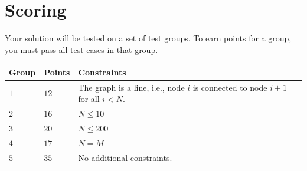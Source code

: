 \section*{Scoring}
Your solution will be tested on a set of test groups.
To earn points for a group, you must pass all test cases in that group.

\noindent
\begin{tabular}{| l | l | l |}
\hline
\textbf{Group} & \textbf{Points} & \textbf{Constraints} \\ \hline
$1$   & $12$       & The graph is a line, i.e., node $i$ is connected to node $i+1$ for all $i < N$. \\ \hline
$2$   & $16$       & $N \leq 10$ \\ \hline
$3$   & $20$       & $N \leq 200$ \\ \hline
$4$   & $17$       & $N = M$ \\ \hline
$5$   & $35$       & No additional constraints. \\ \hline
\end{tabular}
